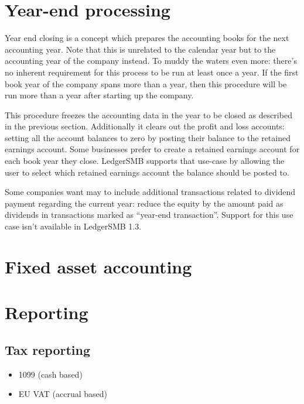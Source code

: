 \section{Year-end processing}
\label{sec-workflows-accounting-year-end-processing}

Year end closing is a concept which prepares the accounting books for the next
accounting year. Note that this is unrelated to the calendar year but to the
accounting year of the company instead. To muddy the waters even more: there's
no inherent requirement for this process to be run at least once a year. If the
first book year of the company spans more than a year, then this procedure will
be run more than a year after starting up the company.

This procedure freezes the accounting data in the year to be closed as described
in the previous section. Additionally it clears out the profit and loss accounts:
setting all the account
balances to zero by posting their balance to the retained earnings account. Some
businesses prefer to create a retained earnings account for each book year they
close. LedgerSMB supports that use-case by allowing the user to select which
retained earnings account the balance should be posted to.

Some companies want may to include additional transactions related to dividend
payment regarding the current year: reduce the equity by the amount paid as
dividends in transactions marked as ``year-end transaction''. Support
for this use case isn't available in LedgerSMB 1.3.




\section{Fixed asset accounting}
\label{sec-workflows-accounting-fixed-asset-accounting}



\section{Reporting}
\label{sec-workflows-accounting-reporting}

\subsection{Tax reporting}
\label{subsec-workflows-accounting-reporting-tax}


\begin{itemize}
\item 1099 (cash based)
\item EU \gls{VAT} (accrual based)
\end{itemize}


